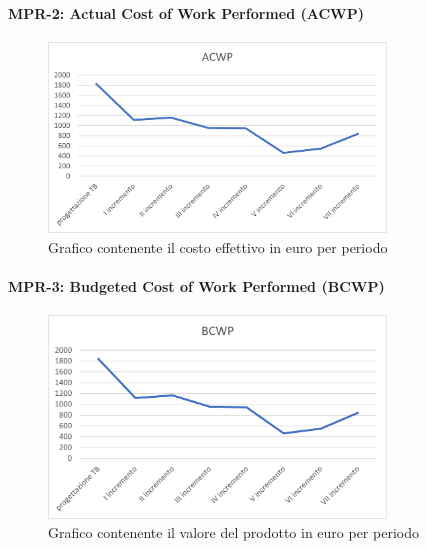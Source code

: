 \paragraph{MPR-2: Actual Cost of Work Performed (ACWP)}\label{_ACWP}
\begin{figure}[!htb]
    \centering
    \includegraphics[width=0.8\textwidth]{res/images/metriche_costi/ACWP.png}
    \caption{Grafico contenente il costo effettivo in euro per periodo}
\end{figure}
\newpage

\paragraph{MPR-3: Budgeted Cost of Work Performed (BCWP)}\label{_BCWP}
\begin{figure}[!htb]
    \centering
    \includegraphics[width=0.8\textwidth]{res/images/metriche_costi/BCWP.png}
    \caption{Grafico contenente il valore del prodotto in euro per periodo}
\end{figure}



